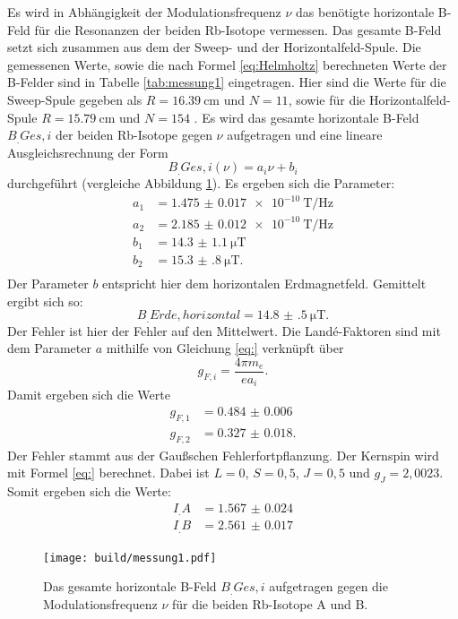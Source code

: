 Es wird in Abhängigkeit der Modulationsfrequenz $\nu$ das benötigte horizontale B-Feld für die Resonanzen der beiden Rb-Isotope vermessen. Das gesamte B-Feld setzt sich zusammen aus dem der Sweep- und der Horizontalfeld-Spule. Die gemessenen Werte, sowie die nach Formel \ref{eq:Helmholtz} berechneten Werte der B-Felder sind in Tabelle \ref{tab:messung1} eingetragen. Hier sind die Werte für die Sweep-Spule gegeben als $R=\SI{16.39}{\centi\metre}$ und $N=11$, sowie für die Horizontalfeld-Spule $R=\SI{15.79}{\centi\metre}$ und $N=154$ \cite{V21}.
Es wird das gesamte horizontale B-Feld $B_.{Ges,i}$ der beiden Rb-Isotope gegen $\nu$ aufgetragen und eine lineare Ausgleichsrechnung der Form
\[
B_.{Ges,i}(\nu) = a_i\nu + b_i
\]
durchgeführt (vergleiche Abbildung \ref{fig:messung1}).
Es ergeben sich die Parameter:
\begin{align*}
a_1 &= \SI{1.475(17)e-10}{\tesla\per\hertz}\\
a_2 &= \SI{2.185(12)e-10}{\tesla\per\hertz}\\
b_1 &= \SI{14.3(11)}{\micro\tesla}\\
b_2 &= \SI{15.3(8)}{\micro\tesla}\text{.}\\
\end{align*}
Der Parameter $b$ entspricht hier dem horizontalen Erdmagnetfeld. Gemittelt ergibt sich so:
\[
B_.{Erde,horizontal} = \SI{14.8(5)}{\micro\tesla}\text{.}
\]
Der Fehler ist hier der Fehler auf den Mittelwert.
Die Landé-Faktoren sind mit dem Parameter $a$ mithilfe von Gleichung \eqref{eq:} verknüpft über
\begin{equation*}
g_{F,i}=\frac{4\pi m_e}{e a_i} \text{.}
\end{equation*}
Damit ergeben sich die Werte
\begin{align*}
g_{F,1} &= \num{0.484(6)}\\
g_{F,2} &= \num{0.327(18)}\text{.}
\end{align*}
Der Fehler stammt aus der Gaußschen Fehlerfortpflanzung.
Der Kernspin wird mit Formel \eqref{eq:} berechnet. Dabei ist $L=0$, $S=0,5$, $J=0,5$ und $g_J=2,0023$. 
Somit ergeben sich die Werte:
\begin{align*}
I_.A &= \num{1.567(24)}\\
I_.B &= \num{2.561(17)}
\end{align*}
\begin{figure}
	\centering
	\texttt{[image: build/messung1.pdf]}
	\caption{Das gesamte horizontale B-Feld $B_.{Ges,i}$ aufgetragen gegen die Modulationsfrequenz $\nu$ für die beiden Rb-Isotope A und B.}
	\label{fig:messung1}
\end{figure}

